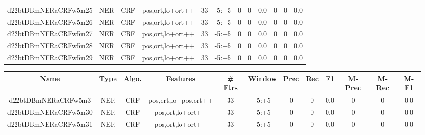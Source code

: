 \documentclass[a4paper]{article}
\begin{document}
\begin{landscape}
\begin{center}
\begin{tabular}{ |c|c|c|c|c|c|c|c|c|c|c|c|}
 
 	
 	\small{ d22btDBmNERaCRFw5m25 } & \small{ NER} & \small{  CRF }  & pos,ort,lo+ort++  &  33 &  \small{  -5:+5 }  &  0 & 0 & 0.0  &  0 & 0 & 0.0 \\
 	

 
 	
 	\small{ d22btDBmNERaCRFw5m26 } & \small{ NER} & \small{  CRF }  & pos,ort,lo+ort++  &  33 &  \small{  -5:+5 }  &  0 & 0 & 0.0  &  0 & 0 & 0.0 \\
 	

 
 	
 	\small{ d22btDBmNERaCRFw5m27 } & \small{ NER} & \small{  CRF }  & pos,ort,lo+ort++  &  33 &  \small{  -5:+5 }  &  0 & 0 & 0.0  &  0 & 0 & 0.0 \\
 	

 
 	
 	\small{ d22btDBmNERaCRFw5m28 } & \small{ NER} & \small{  CRF }  & pos,ort,lo+ort++  &  33 &  \small{  -5:+5 }  &  0 & 0 & 0.0  &  0 & 0 & 0.0 \\
 	

 
 	
 	\small{ d22btDBmNERaCRFw5m29 } & \small{ NER} & \small{  CRF }  & pos,ort,lo+ort++  &  33 &  \small{  -5:+5 }  &  0 & 0 & 0.0  &  0 & 0 & 0.0 \\
 	
 \hline
\end{tabular}
\end{center}




\begin{center}
\begin{tabular}{ |c|c|c|c|c|c|c|c|c|c|c|c|} 
 \hline
 	Name & Type & Algo. & Features & \# Ftrs & Window & Prec & Rec & F1 & M-Prec & M-Rec & M-F1\\
 \hline

 	

 
 	
 	\small{ d22btDBmNERaCRFw5m3 } & \small{ NER} & \small{  CRF }  & pos,ort,lo+pos,ort++  &  33 &  \small{  -5:+5 }  &  0 & 0 & 0.0  &  0 & 0 & 0.0 \\
 	

 
 	
 	\small{ d22btDBmNERaCRFw5m30 } & \small{ NER} & \small{  CRF }  & pos,ort,lo+ort++  &  33 &  \small{  -5:+5 }  &  0 & 0 & 0.0  &  0 & 0 & 0.0 \\
 	

 
 	
 	\small{ d22btDBmNERaCRFw5m31 } & \small{ NER} & \small{  CRF }  & pos,ort,lo+ort++  &  33 &  \small{  -5:+5 }  &  0 & 0 & 0.0  &  0 & 0 & 0.0 \\
 	


\end{tabular}
\end{center}
\end{landscape}
\end{document}
